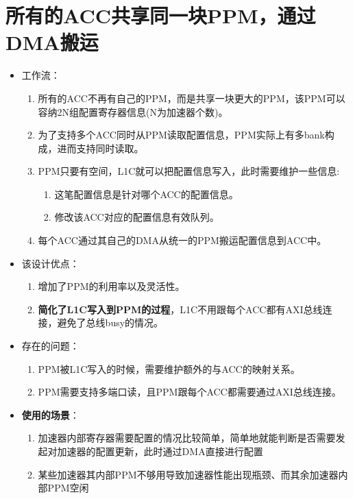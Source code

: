 \documentclass[a4paper, 12pt]{article}
\begin{document}
\section{所有的ACC共享同一块PPM，通过DMA搬运}
\begin{itemize}
  \item 工作流：
    \begin{enumerate}
      \item 所有的ACC不再有自己的PPM，而是共享一块更大的PPM，该PPM可以容纳2N组配置寄存器信息(N为加速器个数)。
      \item 为了支持多个ACC同时从PPM读取配置信息，PPM实际上有多bank构成，进而支持同时读取。
      \item PPM只要有空间，L1C就可以把配置信息写入，此时需要维护一些信息:
        \begin{enumerate}
          \item 这笔配置信息是针对哪个ACC的配置信息。
          \item 修改该ACC对应的配置信息有效队列。
        \end{enumerate}
      \item 每个ACC通过其自己的DMA从统一的PPM搬运配置信息到ACC中。
    \end{enumerate}
  \item 该设计优点：
    \begin{enumerate}
      \item 增加了PPM的利用率以及灵活性。
      \item \textbf{简化了L1C写入到PPM的过程}，L1C不用跟每个ACC都有AXI总线连接，避免了总线busy的情况。
    \end{enumerate}
  \item 存在的问题：
    \begin{enumerate}
      \item PPM被L1C写入的时候，需要维护额外的与ACC的映射关系。
      \item PPM需要支持多端口读，且PPM跟每个ACC都需要通过AXI总线连接。
    \end{enumerate}
  \item \textbf{使用的场景}：
    \begin{enumerate}
      \item 加速器内部寄存器需要配置的情况比较简单，简单地就能判断是否需要发起对加速器的配置更新，此时通过DMA直接进行配置
      \item 某些加速器其内部PPM不够用导致加速器性能出现瓶颈、而其余加速器内部PPM空闲
    \end{enumerate}
\end{itemize}
\end{document}
